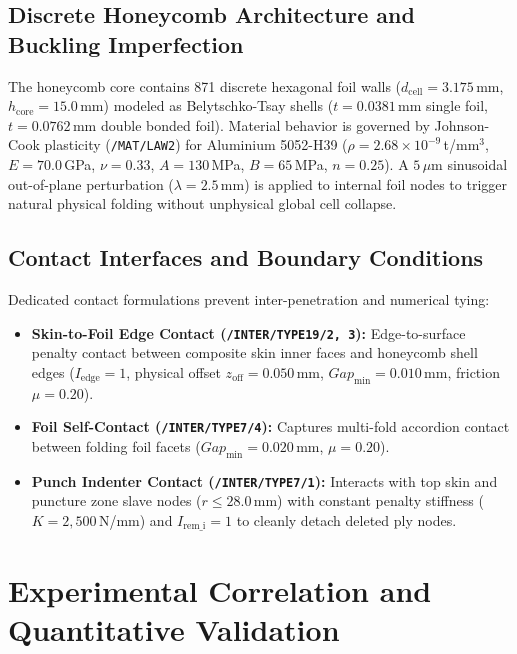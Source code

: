 \documentclass[11pt,a4paper]{article}
\begin{document}
\subsection{Discrete Honeycomb Architecture and Buckling Imperfection}
The honeycomb core contains 871 discrete hexagonal foil walls ($d_{\text{cell}} = 3.175$\,mm, $h_{\text{core}} = 15.0$\,mm) modeled as Belytschko-Tsay shells ($t = 0.0381$\,mm single foil, $t = 0.0762$\,mm double bonded foil). Material behavior is governed by Johnson-Cook plasticity (\texttt{/MAT/LAW2}) for Aluminium 5052-H39 ($\rho = 2.68 \times 10^{-9}$\,t/mm$^3$, $E = 70.0$\,GPa, $\nu = 0.33$, $A = 130$\,MPa, $B = 65$\,MPa, $n = 0.25$). A $5\,\mu\text{m}$ sinusoidal out-of-plane perturbation ($\lambda = 2.5$\,mm) is applied to internal foil nodes to trigger natural physical folding without unphysical global cell collapse.

\subsection{Contact Interfaces and Boundary Conditions}
Dedicated contact formulations prevent inter-penetration and numerical tying:
\begin{itemize}
    \item \textbf{Skin-to-Foil Edge Contact (\texttt{/INTER/TYPE19/2, 3}):} Edge-to-surface penalty contact between composite skin inner faces and honeycomb shell edges ($I_{\text{edge}} = 1$, physical offset $z_{\text{off}} = 0.050$\,mm, $Gap_{\text{min}} = 0.010$\,mm, friction $\mu = 0.20$).
    \item \textbf{Foil Self-Contact (\texttt{/INTER/TYPE7/4}):} Captures multi-fold accordion contact between folding foil facets ($Gap_{\text{min}} = 0.020$\,mm, $\mu = 0.20$).
    \item \textbf{Punch Indenter Contact (\texttt{/INTER/TYPE7/1}):} Interacts with top skin and puncture zone slave nodes ($r \le 28.0$\,mm) with constant penalty stiffness ($K = 2,500$\,N/mm) and $I_{\text{rem\_i}} = 1$ to cleanly detach deleted ply nodes.
\end{itemize}

\section{Experimental Correlation and Quantitative Validation}
\end{document}
